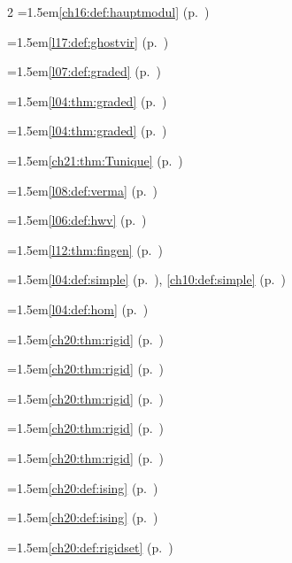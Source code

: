\begin{multicols}{2}
\hangindent=1.5em\quad \ref{ch16:def:hauptmodul} (p.~\pageref{ch16:def:hauptmodul})\par
\hangindent=1.5em\quad \ref{l17:def:ghostvir} (p.~\pageref{l17:def:ghostvir})\par
\hangindent=1.5em\quad \ref{l07:def:graded} (p.~\pageref{l07:def:graded})\par
\hangindent=1.5em\quad \ref{l04:thm:graded} (p.~\pageref{l04:thm:graded})\par
\hangindent=1.5em\quad \ref{l04:thm:graded} (p.~\pageref{l04:thm:graded})\par
\hangindent=1.5em\quad \ref{ch21:thm:Tunique} (p.~\pageref{ch21:thm:Tunique})\par
\hangindent=1.5em\quad \ref{l08:def:verma} (p.~\pageref{l08:def:verma})\par
\hangindent=1.5em\quad \ref{l06:def:hwv} (p.~\pageref{l06:def:hwv})\par
\hangindent=1.5em\quad \ref{l12:thm:fingen} (p.~\pageref{l12:thm:fingen})\par
\hangindent=1.5em\quad \ref{l04:def:simple} (p.~\pageref{l04:def:simple}), \ref{ch10:def:simple} (p.~\pageref{ch10:def:simple})\par
\hangindent=1.5em\quad \ref{l04:def:hom} (p.~\pageref{l04:def:hom})\par
\hangindent=1.5em\quad \ref{ch20:thm:rigid} (p.~\pageref{ch20:thm:rigid})\par
\hangindent=1.5em\quad \ref{ch20:thm:rigid} (p.~\pageref{ch20:thm:rigid})\par
\hangindent=1.5em\quad \ref{ch20:thm:rigid} (p.~\pageref{ch20:thm:rigid})\par
\hangindent=1.5em\quad \ref{ch20:thm:rigid} (p.~\pageref{ch20:thm:rigid})\par
\hangindent=1.5em\quad \ref{ch20:thm:rigid} (p.~\pageref{ch20:thm:rigid})\par
\hangindent=1.5em\quad \ref{ch20:def:ising} (p.~\pageref{ch20:def:ising})\par
\hangindent=1.5em\quad \ref{ch20:def:ising} (p.~\pageref{ch20:def:ising})\par
\hangindent=1.5em\quad \ref{ch20:def:rigidset} (p.~\pageref{ch20:def:rigidset})\par

\end{multicols}
